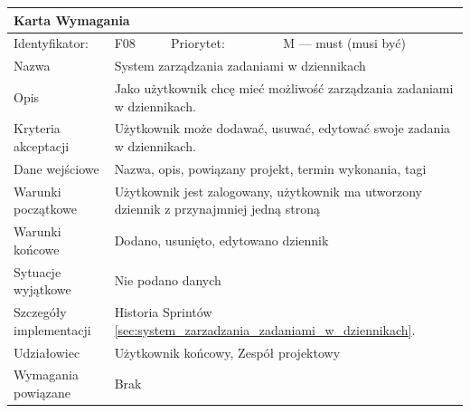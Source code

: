 \documentclass[a4paper,11pt]{report}
\begin{document}
		\begin{tabular}{|p{3cm}|p{2cm}|p{2cm}|p{6cm}|}
		\hline
		\multicolumn{4}{|p{12 cm}|}{Karta Wymagania}\\
		\hline
		Identyfikator: & F08 & Priorytet: & M — must (musi być)\\
		\hline
		Nazwa & \multicolumn{3}{|p{10 cm}|}{System zarządzania zadaniami w dziennikach}\\
		\hline
		Opis & \multicolumn{3}{|p{10 cm}|}{Jako użytkownik chcę mieć możliwość zarządzania zadaniami w dziennikach.}\\
		\hline
		Kryteria akceptacji & \multicolumn{3}{|p{10 cm}|}{Użytkownik może dodawać, usuwać, edytować swoje zadania w dziennikach.}\\
		\hline
		Dane wejściowe & \multicolumn{3}{|p{10 cm}|}{Nazwa, opis, powiązany projekt, termin wykonania, tagi}\\
		\hline
		Warunki początkowe & \multicolumn{3}{|p{10 cm}|}{Użytkownik jest zalogowany, użytkownik ma utworzony dziennik z przynajmniej jedną stroną}\\
		\hline
		Warunki końcowe & \multicolumn{3}{|p{10 cm}|}{Dodano, usunięto, edytowano dziennik}\\
		\hline
		Sytuacje wyjątkowe & \multicolumn{3}{|p{10 cm}|}{Nie podano danych}\\
		\hline
		Szczegóły implementacji & \multicolumn{3}{|p{10 cm}|}{Historia Sprintów \ref{sec:system_zarzadzania_zadaniami_w_dziennikach}.}\\
		\hline
		Udziałowiec & \multicolumn{3}{|p{10 cm}|}{Użytkownik końcowy, Zespół projektowy}\\
		\hline
		Wymagania powiązane & \multicolumn{3}{|p{10 cm}|}{Brak}\\
		\hline
		\end{tabular}\\
		\newline
		\vspace*{0,2 cm}
		\newline
\end{document}

